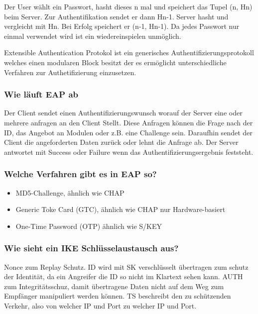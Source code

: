 	
	 Der User wählt ein Passwort, hasht dieses n mal und speichert das Tupel (n, Hn) beim Server. Zur Authentifikation sendet er dann Hn-1. Server hasht und vergleicht mit Hn. Bei Erfolg speichert er (n-1, Hn-1). Da jedes Passwort nur einmal verwendet wird ist ein wiedereinspielen unmöglich.
	
	Extensible Authentication Protokol ist ein generisches Authentifizierungsprotokoll welches einen modularen Block besitzt der es ermöglicht unterschiedliche Verfahren zur Authetifizierung einzusetzen. %
	
	\subsubsection{Wie läuft EAP ab}
	Der Client sendet einen Authentifizierungswunsch worauf der Server eine oder mehrere anfragen an den Client Stellt. Diese Anfragen können die Frage nach der ID, das Angebot an Modulen oder z.B. eine Challenge sein.
	Daraufhin sendet der Client die angeforderten Daten zurück oder lehnt die Anfrage ab. Der Server antwortet mit Success oder Failure wenn das Authentifizierungsergebnis feststeht.
	\subsubsection{Welche Verfahren gibt es in EAP so?}
		\begin{itemize}
			\item MD5-Challenge, ähnlich wie CHAP
			\item Generic Toke Card (GTC), ähnlich wie CHAP nur Hardware-basiert
			\item One-Time Password (OTP) ähnlich wie S/KEY
\end{itemize}		 			
		
	\subsubsection{Wie sieht ein IKE Schlüsselaustausch aus?}
	Nonce zum Replay Schutz. ID wird mit SK verschlüsselt übertragen zum schutz der Identität, da ein Angreifer die ID so nicht im Klartext sehen kann.
	AUTH zum Integritätsschuz, damit übertragene Daten nicht auf dem Weg zum Empfänger manipuliert werden können. 
	TS beschreibt den zu schützenden Verkehr, also von welcher IP und Port zu welcher IP und Port.
	
